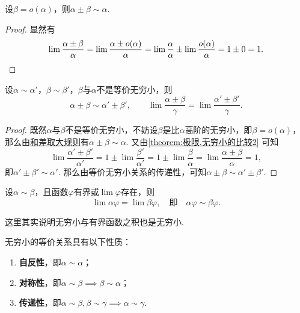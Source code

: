 \begin{theorem}[和差取大规则]\label{theorem:极限.无穷小的比较3}
设\(\beta=o(\alpha)\)，则\(\alpha\pm\beta\sim\alpha\).
\begin{proof}
显然有\[
\lim \frac{\alpha\pm\beta}{\alpha}
= \lim \frac{\alpha\pm o(\alpha)}{\alpha}
= \lim \frac{\alpha}{\alpha} \pm \lim \frac{o(\alpha)}{\alpha}
= 1 \pm 0 = 1.
\qedhere
\]
\end{proof}
\end{theorem}

\begin{theorem}[和差代替规则]\label{theorem:极限.无穷小的比较4}
设\(\alpha\sim\alpha'\)，\(\beta\sim\beta'\)，\(\beta\)与\(\alpha\)不是等价无穷小，则\[
\alpha\pm\beta\sim\alpha'\pm\beta',
\qquad
\lim \frac{\alpha\pm\beta}{\gamma} = \lim \frac{\alpha'\pm\beta'}{\gamma}.
\]
\begin{proof}
既然\(\alpha\)与\(\beta\)不是等价无穷小，不妨设\(\beta\)是比\(\alpha\)高阶的无穷小，即\(\beta = o(\alpha)\)，那么由\hyperref[theorem:极限.无穷小的比较3]{和差取大规则}有\(\alpha\pm\beta \sim \alpha\).
又由\cref{theorem:极限.无穷小的比较2} 可知\[
\lim \frac{\alpha'\pm\beta'}{\alpha'}
= 1 \pm \lim \frac{\beta'}{\alpha'}
= 1 \pm \lim \frac{\beta}{\alpha}
= \lim \frac{\alpha\pm\beta}{\alpha}
= 1,
\]即\(\alpha'\pm\beta' \sim \alpha'\).
那么由等价无穷小关系的传递性，可知\(\alpha\pm\beta \sim \alpha'\pm\beta'\).
\end{proof}
\end{theorem}

\begin{theorem}[因式代替规则]\label{theorem:极限.无穷小的比较5}
设\(\alpha\sim\beta\)，且函数\(\varphi\)有界或\(\lim\varphi\)存在，则\[
\lim \alpha \varphi = \lim \beta \varphi,
\quad\text{即}\quad
\alpha \varphi \sim \beta \varphi.
\]
\end{theorem}
这里其实说明无穷小与有界函数之积也是无穷小.

\begin{property}\label{theorem:极限.无穷小的比较6}
无穷小的等价关系具有以下性质：
\begin{enumerate}
\item {\bf 自反性}，即\(\alpha \sim \alpha\)；
\item {\bf 对称性}，即\(\alpha \sim \beta \implies \beta \sim \alpha\)；
\item {\bf 传递性}，即\(\alpha \sim \beta, \beta \sim \gamma \implies \alpha \sim \gamma\).
\end{enumerate}
\end{property}


